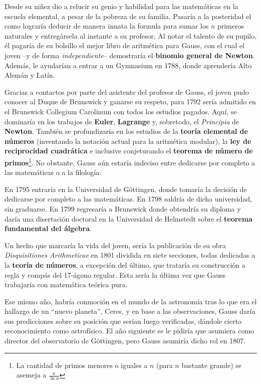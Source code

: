 \documentclass[11pt,oneside]{book}
\begin{document}
Desde su niñez dio a relucir su genio y habilidad para las matemáticas en la escuela elemental, a pesar de la pobreza de su familia. Pasaría a la posteridad el como lograría deducir de manera innata la formula para sumar los $n$ primeros naturales y entregársela al instante a su profesor. Al notar el talento de su pupilo, él pagaría de su bolsillo el mejor libro de aritmética para Gauss, con el cual el joven --y de forma \textit{independiente}-- demostraría el \textbf{binomio general de Newton}. Además, le ayudarían a entrar a un Gymnasium en 1788, donde aprendería Alto Alemán y Latín.

Gracias a contactos por parte del asistente del profesor de Gauss, el joven pudo conocer al Duque de Brunswick y ganarse su respeto, para 1792 sería admitido en el Brunswick Collegium Carolinum con todos los estudios pagados. Aquí, se dominaría en los trabajos de \textbf{Euler}, \textbf{Lagrange} y, sobretodo, el \textit{Principia} de \textbf{Newton}. También se profundizaría en los estudios de la \textbf{teoría elemental de números} (inventando la notación actual para la aritmética modular), la \textbf{ley de reciprocidad cuadrática} e inclusive conjeturando el \textbf{teorema de número de primos}\footnote{La cantidad de primos menores o iguales a $n$ (para $n$ bastante grande) se asemeja a $\displaystyle\frac{n}{\ln n}$}. No obstante, Gauss aún estaría indeciso entre dedicarse por completo a las matemáticas o a la filología.

En 1795 entraría en la Universidad de Göttingen, donde tomaría la decisión de dedicarse por completo a las matemáticas. En 1798 saldría de dicha universidad, sin graduarse. En 1799 regresaría a Brunswick donde obtendría su diploma y daría una disertación doctoral en la Universidad de Helmstedt sobre el \textbf{teorema fundamental del álgebra}.

Un hecho que marcaría la vida del joven, sería la publicación de su obra \textit{Disquisitiones Arithmeticae} en 1801 dividida en siete secciones, todas dedicadas a la \textbf{teoría de números}, a excepción del último, que trataría su construcción a regla y compás del 17-ágono regular. Esta sería la última vez que Gauss trabajaría con matemática teórica pura.

Ese mismo año, habría conmoción en el mundo de la astronomía tras lo que era el hallazgo de un ``nuevo planeta'', Ceres, y en base a las observaciones, Gauss daría sus predicciones sobre su posición que serían luego verificadas, dándole cierto reconocimiento como astrofísico. El año siguiente se le pidiría que asumiera como director del observatorio de Göttingen, pero Gauss asumiría dicho rol en 1807.
\end{document}
